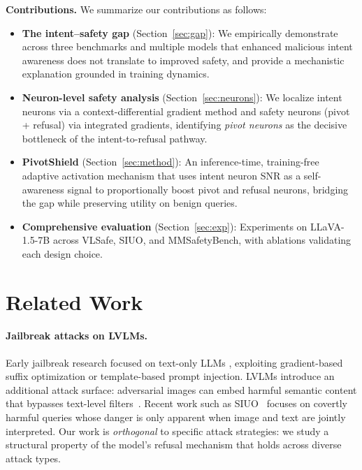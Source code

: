 \documentclass{article}
\newcommand{\method}{PivotShield\xspace}
\begin{document}
\textbf{Contributions.}  We summarize our contributions as follows:
\begin{itemize}
  \item \textbf{The intent--safety gap} (Section~\ref{sec:gap}):
    We empirically demonstrate across three benchmarks and
    multiple models that enhanced malicious intent awareness does
    not translate to improved safety, and provide a mechanistic
    explanation grounded in training dynamics.
  \item \textbf{Neuron-level safety analysis}
    (Section~\ref{sec:neurons}):
    We localize intent neurons via a context-differential gradient
    method and safety neurons (pivot + refusal) via integrated
    gradients, identifying \emph{pivot neurons} as the decisive
    bottleneck of the intent-to-refusal pathway.
  \item \textbf{\method} (Section~\ref{sec:method}):
    An inference-time, training-free adaptive activation mechanism
    that uses intent neuron SNR as a self-awareness signal to
    proportionally boost pivot and refusal neurons, bridging the
    gap while preserving utility on benign queries.
  \item \textbf{Comprehensive evaluation} (Section~\ref{sec:exp}):
    Experiments on LLaVA-1.5-7B across VLSafe, SIUO, and
    MMSafetyBench, with ablations validating each design choice.
\end{itemize}

\section{Related Work}
\label{sec:related}

\paragraph{Jailbreak attacks on LVLMs.}
Early jailbreak research focused on text-only LLMs
\citep{PLACEHOLDER_gcg_verify, PLACEHOLDER_autodan_verify},
exploiting gradient-based suffix optimization or template-based
prompt injection.
LVLMs introduce an additional attack surface: adversarial images
can embed harmful semantic content that bypasses text-level
filters~\citep{PLACEHOLDER_figstep_verify,
PLACEHOLDER_mmsafetybench_verify}.
Recent work such as SIUO~\citep{PLACEHOLDER_siuo_verify} focuses
on covertly harmful queries whose danger is only apparent when
image and text are jointly interpreted.
Our work is \emph{orthogonal} to specific attack strategies: we
study a structural property of the model's refusal mechanism that
holds across diverse attack types.
\end{document}
